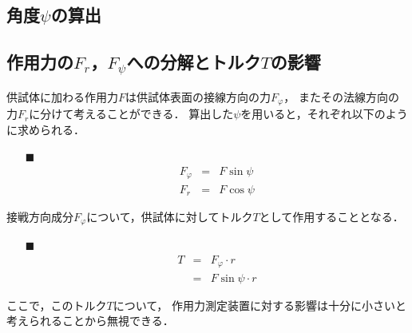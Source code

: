 \documentclass[twocolumn,a4j]{jsarticle}
\begin{document}
\subsection{角度$\psi$の算出}

\subsection{作用力の$F_r$，$F_\psi$への分解とトルク$T$の影響}

供試体に加わる作用力$F$は供試体表面の接線方向の力$F_\varphi$，
またその法線方向の力$F_r$に分けて考えることができる．
算出した$\psi$を用いると，それぞれ以下のように求められる．

\begin{itemize}
    \item [$\blacksquare$] 
    \begin{eqnarray*}
        F_\varphi &=& F \sin \psi \\
        F_r &=& F \cos \psi 
    \end{eqnarray*}
\end{itemize}

接戦方向成分$F_\varphi$について，供試体に対してトルク$T$として作用することとなる．

\begin{itemize}
    \item [$\blacksquare$] 
    \begin{eqnarray*}
        T &=& F_\varphi \cdot r\\
        &=& F \sin \psi \cdot r 
    \end{eqnarray*}
\end{itemize}

ここで，このトルク$T$について，
作用力測定装置に対する影響は十分に小さいと考えられることから無視できる．
\end{document}

